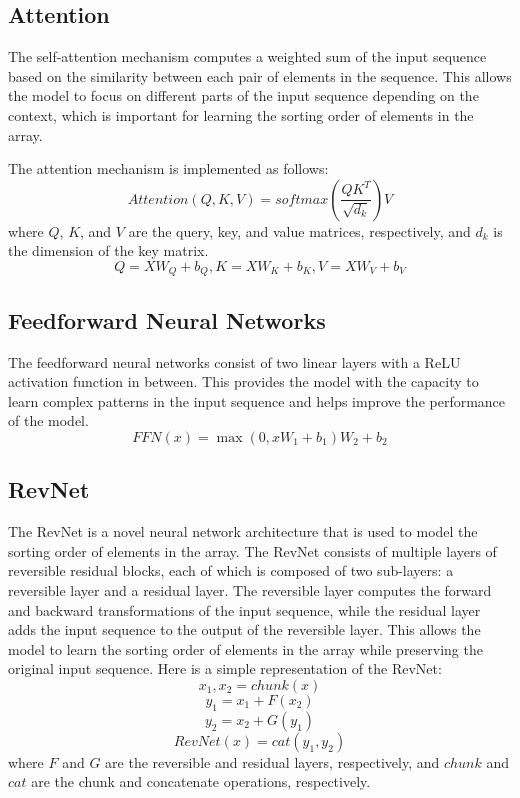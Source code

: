 \documentclass{article}
\begin{document}
\subsection{Attention}
The self-attention mechanism computes a weighted sum of the input sequence based on the similarity between each pair of elements in the sequence. This allows the model to focus on different parts of the input sequence depending on the context, which is important for learning the sorting order of elements in the array.

The attention mechanism is implemented as follows:
\begin{equation}
    Attention(Q, K, V) = softmax(\frac{QK^T}{\sqrt{d_k}})V
\end{equation}
where $Q$, $K$, and $V$ are the query, key, and value matrices, respectively, and $d_k$ is the dimension of the key matrix.
\begin{equation}
    Q = XW_Q+b_Q, K = XW_K+b_K, V = XW_V+b_V
\end{equation}

\subsection{Feedforward Neural Networks}
The feedforward neural networks consist of two linear layers with a ReLU activation function in between. This provides the model with the capacity to learn complex patterns in the input sequence and helps improve the performance of the model.
\begin{equation}
    FFN(x) = \max(0, xW_1 + b_1)W_2 + b_2
\end{equation}

\subsection{RevNet}
The RevNet is a novel neural network architecture that is used to model the sorting order of elements in the array. The RevNet consists of multiple layers of reversible residual blocks, each of which is composed of two sub-layers\cite{theefficienttransformer}: a reversible layer and a residual layer. The reversible layer computes the forward and backward transformations of the input sequence, while the residual layer adds the input sequence to the output of the reversible layer. This allows the model to learn the sorting order of elements in the array while preserving the original input sequence.
Here is a simple representation of the RevNet:
\begin{equation}
    x_1,x_2 = chunk(x)
\end{equation}
\begin{equation}
    y_1 = x_1 + F(x_2)
\end{equation}
\begin{equation}
    y_2 = x_2 + G(y_1)
\end{equation}
\begin{equation}
    RevNet(x) = cat(y_1, y_2)
\end{equation}
where $F$ and $G$ are the reversible and residual layers, respectively, and $chunk$ and $cat$ are the chunk and concatenate operations, respectively.
\end{document}
